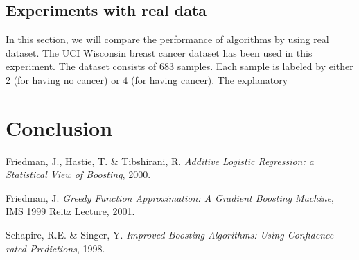 \documentclass[a4paper,twoside,12pt]{article}
\begin{document}
\subsection{Experiments with real data}
In this section, we will compare the performance of algorithms by using real dataset. The UCI Wisconsin breast cancer dataset has been used in this experiment. The dataset consists of 683  samples. Each sample is labeled by either 2 (for having no cancer) or 4 (for having cancer). The explanatory 

\section{Conclusion}

\begin{thebibliography}{9999}%
Friedman, J., Hastie, T. \& Tibshirani, R. \textsl{Additive Logistic Regression: a Statistical View of Boosting}, 2000.

Friedman, J. \textsl{Greedy Function Approximation: A Gradient Boosting Machine}, IMS 1999 Reitz Lecture, 2001.

Schapire, R.E. \& Singer, Y. \textsl{Improved Boosting Algorithms: Using Confidence-rated Predictions}, 1998.

\end{thebibliography}
\end{document}

